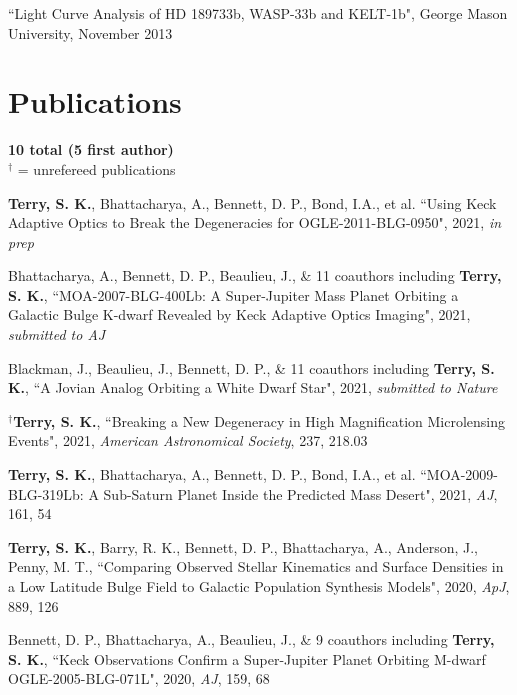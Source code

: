 \documentclass[margin,line]{res}
\begin{document}
\begin{resume}
\begin{etaremune}
\item ``Light Curve Analysis of HD 189733b, WASP-33b and KELT-1b", George Mason University, November 2013 \\

\end{etaremune}

\section{\sc Publications}
\textbf{10 total (5 first author)}\\
$^{\dagger}$ = unrefereed publications \\
\begin{etaremune}
\item \textbf{Terry, S. K.}, Bhattacharya, A., Bennett, D. P., Bond, I.A., et al. ``Using Keck Adaptive Optics to Break the Degeneracies for OGLE-2011-BLG-0950", 2021, \textit{in prep}

\item Bhattacharya, A., Bennett, D. P., Beaulieu, J., \& 11 coauthors including \textbf{Terry, S. K.}, ``MOA-2007-BLG-400Lb: A Super-Jupiter Mass Planet Orbiting a Galactic Bulge K-dwarf Revealed by Keck Adaptive Optics Imaging", 2021, \textit{submitted to AJ}

\item Blackman, J., Beaulieu, J., Bennett, D. P., \& 11 coauthors including {\bf Terry, S. K.}, ``A Jovian Analog Orbiting a White Dwarf Star", 2021, \textit{submitted to Nature}

\item $^{\dagger}${\bf Terry, S. K.}, ``Breaking a New Degeneracy in High Magnification Microlensing Events", 2021, \textit{American Astronomical Society}, 237, 218.03

\item \textbf{Terry, S. K.}, Bhattacharya, A., Bennett, D. P., Bond, I.A., et al. ``MOA-2009-BLG-319Lb: A Sub-Saturn Planet Inside the Predicted Mass Desert", 2021, \textit{AJ}, 161, 54

\item {\bf Terry, S. K.}, Barry, R. K., Bennett, D. P., Bhattacharya, A., Anderson, J., Penny, M. T., ``Comparing Observed Stellar Kinematics and Surface Densities in a Low Latitude Bulge Field to Galactic Population Synthesis Models", 2020, \textit{ApJ}, 889, 126

\item Bennett, D. P., Bhattacharya, A., Beaulieu, J., \& 9 coauthors including {\bf Terry, S. K.}, ``Keck Observations Confirm a Super-Jupiter Planet Orbiting M-dwarf OGLE-2005-BLG-071L", 2020, \textit{AJ}, 159, 68


\end{etaremune}
\end{resume}
\end{document}
